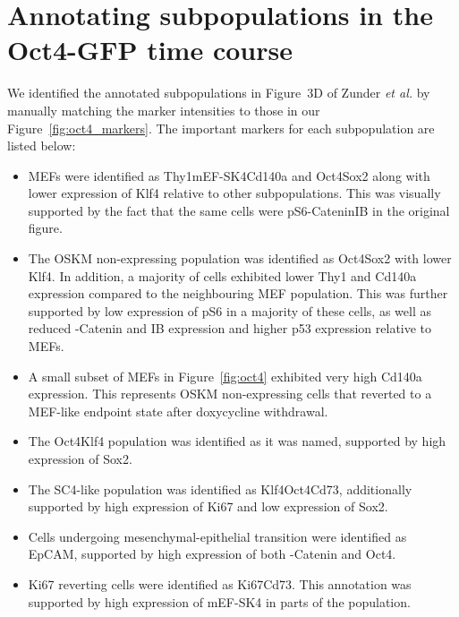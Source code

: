 \documentclass{article}
\begin{document}
\section{Annotating subpopulations in the Oct4-GFP time course}
We identified the annotated subpopulations in Figure~3D of Zunder \emph{et al.} \cite{zunder2015continuous} by manually matching the marker intensities to those in our Figure~\ref{fig:oct4_markers}.
The important markers for each subpopulation are listed below:
\begin{itemize}
    \item MEFs were identified as Thy1\hi{}mEF-SK4\hi{}Cd140a\hi{} and Oct4\lo{}Sox2\lo{} along with lower expression of Klf4 relative to other subpopulations.
        This was visually supported by the fact that the same cells were pS6\hi{}\textbeta-Catenin\hi{}I\textkappa{}B\textalpha\hi{} in the original figure.
    \item The OSKM non-expressing population was identified as Oct4\lo{}Sox2\lo{} with lower Klf4.
        In addition, a majority of cells exhibited lower Thy1 and Cd140a expression compared to the neighbouring MEF population.
        This was further supported by low expression of pS6 in a majority of these cells, as well as reduced \textbeta-Catenin and I\textkappa{}B\textalpha{} expression and higher p53 expression relative to MEFs.
    \item A small subset of MEFs in Figure~\ref{fig:oct4} exhibited very high Cd140a expression.
This represents OSKM non-expressing cells that reverted to a MEF-like endpoint state after doxycycline withdrawal.
    \item The Oct4\hi{}Klf4\hi{} population was identified as it was named, supported by high expression of Sox2.
    \item The SC4-like population was identified as Klf4\hi{}Oct4\hi{}Cd73\hi{}, additionally supported by high expression of Ki67 and low expression of Sox2.
    \item Cells undergoing mesenchymal-epithelial transition were identified as EpCAM\hi{}, supported by high expression of both \textbeta-Catenin and Oct4.
    \item Ki67\lo{} reverting cells were identified as Ki67\lo{}Cd73\hi{}.
        This annotation was supported by high expression of mEF-SK4 in parts of the population.

\end{itemize}
\end{document}
